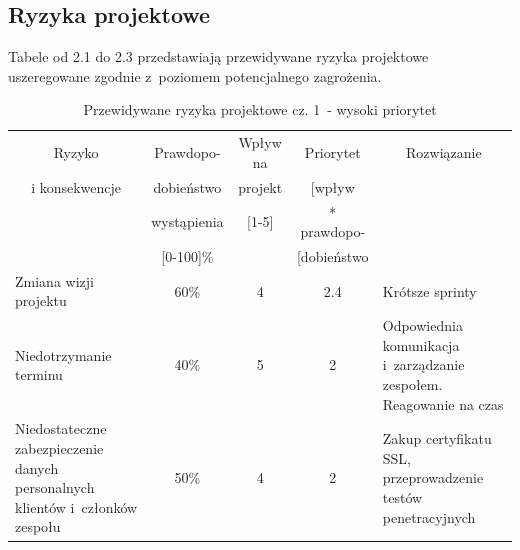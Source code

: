 \documentclass[a4paper,11pt]{article}
\begin{document}
\subsection{Ryzyka projektowe}
Tabele od 2.1 do 2.3 przedstawiają przewidywane ryzyka projektowe uszeregowane zgodnie z~poziomem potencjalnego zagrożenia.
\begin{table}[h!]
	\centering
	\caption{Przewidywane ryzyka projektowe cz. 1~- wysoki priorytet}
	\bgroup
	\begin{tabular}{|p{5cm}|c|c|c|p{5cm}|}
		
		
		\hline
		\multicolumn{1}{|c|}{Ryzyko} & \multicolumn{1}{c|}{Prawdopo-} & \multicolumn{1}{c|}{Wpływ na} & \multicolumn{1}{c|}{Priorytet } & \multicolumn{1}{c|}{Rozwiązanie} \\
		\multicolumn{1}{|c|}{i konsekwencje} & \multicolumn{1}{c|}{dobieństwo} & \multicolumn{1}{c|}{projekt} & \multicolumn{1}{c|}{[wpływ} &  \\
		\multicolumn{1}{|c|}{} & \multicolumn{1}{c|}{wystąpienia} & \multicolumn{1}{c|}{[1-5]} & \multicolumn{1}{c|}{* prawdopo-} & \multicolumn{1}{c|}{} \\
		\multicolumn{1}{|c|}{} & \multicolumn{1}{c|}{[0-100]\%} & \multicolumn{1}{c|}{} & \multicolumn{1}{c|}{[dobieństwo} &  \\ \hline \hline
		
		
		Zmiana wizji projektu & 60\% & 4 & 2.4 & Krótsze sprinty  \\ \hline
		Niedotrzymanie terminu & 40\% & 5 & 2 & Odpowiednia komunikacja i~zarządzanie zespołem. Reagowanie na czas
		\\ \hline
		Niedostateczne zabezpieczenie danych personalnych klientów i~członków zespołu & 50\% & 4 & 2 & Zakup certyfikatu SSL, przeprowadzenie testów penetracyjnych
		\\ \hline
		
		
		
	
		
		
	\end{tabular}
	\egroup
\end{table}
\end{document}
